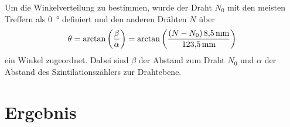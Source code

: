 \documentclass[11pt, ngerman, fleqn, DIV=15, headinclude, BCOR=2cm]{scrreprt}
\begin{document}
Um die Winkelverteilung zu bestimmen, wurde der Draht $N_0$ mit den meisten Treffern
als \SI{0}{\degree} definiert und den anderen Drähten $N$ über
\begin{equation}
	\theta = \arctan{\del{\frac{\beta}{\alpha}}} = \arctan{\del{\frac{\del{N - N_0}
	\SI{8.5}{\milli\metre}}{\SI{123.5}{\milli\metre}}}}
\end{equation}
ein Winkel zugeordnet. Dabei sind $\beta$ der Abstand zum Draht $N_0$ und
$\alpha$ der Abstand des Szintilationszählers zur Drahtebene.



\chapter{Ergebnis}



\end{document}
